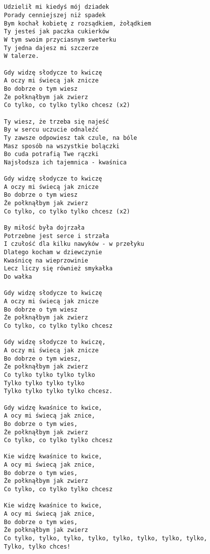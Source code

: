 \documentclass[12pt]{article}
\begin{document}
\subsection*{}
\begin{verbatim}
Udzielił mi kiedyś mój dziadek
Porady cenniejszej niż spadek
Bym kochał kobietę z rozsądkiem, żołądkiem
Ty jesteś jak paczka cukierków
W tym swoim przyciasnym sweterku
Ty jedna dajesz mi szczerze
W talerze.

Gdy widzę słodycze to kwiczę
A oczy mi świecą jak znicze
Bo dobrze o tym wiesz
Że połknąłbym jak zwierz
Co tylko, co tylko tylko chcesz (x2)

Ty wiesz, że trzeba się najeść
By w sercu uczucie odnaleźć
Ty zawsze odpowiesz tak czule, na bóle
Masz sposób na wszystkie bolączki
Bo cuda potrafią Twe rączki
Najsłodsza ich tajemnica - kwaśnica

Gdy widzę słodycze to kwiczę
A oczy mi świecą jak znicze
Bo dobrze o tym wiesz
Że połknąłbym jak zwierz
Co tylko, co tylko tylko chcesz (x2)

By miłość była dojrzała
Potrzebne jest serce i strzała
I czułość dla kilku nawyków - w przełyku
Dlatego kocham w dziewczynie
Kwaśnicę na wieprzowinie
Lecz liczy się również smykałka
Do wałka

Gdy widzę słodycze to kwiczę
A oczy mi świecą jak znicze
Bo dobrze o tym wiesz
Że połknąłbym jak zwierz
Co tylko, co tylko tylko chcesz

Gdy widzę słodycze to kwiczę,
A oczy mi świecą jak znicze
Bo dobrze o tym wiesz,
Że połknąłbym jak zwierz
Co tylko tylko tylko tylko
Tylko tylko tylko tylko
Tylko tylko tylko tylko chcesz.

Gdy widzę kwaśnice to kwice,
A ocy mi świecą jak znice,
Bo dobrze o tym wies,
Że połknąłbym jak zwierz
Co tylko, co tylko tylko chcesz

Kie widzę kwaśnice to kwice,
A ocy mi świecą jak znice,
Bo dobrze o tym wies,
Że połknąłbym jak zwierz
Co tylko, co tylko tylko chcesz

Kie widzę kwaśnice to kwice,
A ocy mi świecą jak znice,
Bo dobrze o tym wies,
Że połknąłbym jak zwierz
Co tylko, tylko, tylko, tylko, tylko, tylko, tylko, tylko,
Tylko, tylko chces!
\end{verbatim}
\clearpage
\end{document}
